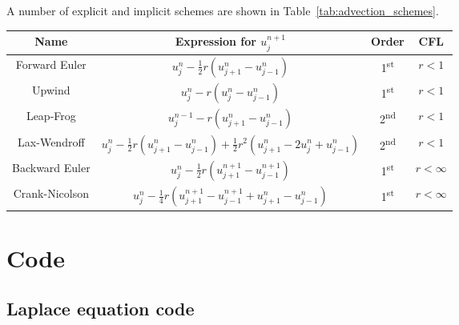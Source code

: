 \documentclass[twocolumn]{myarticle}
\begin{document}
A number of explicit and implicit schemes are shown in Table~\ref{tab:advection_schemes}.


\begin{table*}[ht]
    \centering
    \begin{tabular}{cccc}
        \toprule
        Name & Expression for $ u^{n+1}_j $ & Order & CFL 
        \\
        \midrule
        Forward Euler & $ u^n_j - \frac{1}{2} r \left(u^{n}_{j+1} - u^{n}_{j-1}\right) $ & 1\textsuperscript{st} & $ r < 1 $ 
        \\[1.5ex]
        Upwind & $ u^n_j - r \left(u^{n}_{j} - u^{n}_{j-1}\right) $ & 1\textsuperscript{st} & $ r < 1 $ 
        \\[1.5ex]
        Leap-Frog & $ u^{n-1}_j - r \left(u^{n}_{j+1} - u^{n}_{j-1}\right) $ & 2\textsuperscript{nd} & $ r < 1 $ 
        \\[1.5ex]
    Lax-Wendroff & $ u^n_j - \frac{1}{2} r \left(u^{n}_{j+1} - u^{n}_{j-1}\right) + \frac{1}{2} r^2 \left(u^{n}_{j+1} - 2 u^n_j + u^{n}_{j-1}\right) $ & 2\textsuperscript{nd} & $ r < 1 $ 
        \\[1.5ex]
        \midrule
        Backward Euler & $ u^n_j - \frac{1}{2} r \left(u^{n+1}_{j+1} - u^{n+1}_{j-1}\right) $ & 1\textsuperscript{st} & $ r < \infty $ 
        \\[1.5ex]
        Crank-Nicolson & $ u^n_j - \frac{1}{4} r \left( u^{n+1}_{j+1} - u^{n+1}_{j-1} + u^{n}_{j+1} - u^{n}_{j-1}\right) $ & 1\textsuperscript{st} & $ r < \infty $ 
        \\[1.5ex]
        \bottomrule
    \end{tabular}
    \caption{Finite difference schemes for the advection equation.}
    \label{tab:advection_schemes}
\end{table*}

\onecolumn

\section{Code}
\label{sec:code}

\subsection{Laplace equation code}
\label{subsec:laplace_equation_code}


\vspace{10pt}
\end{document}
